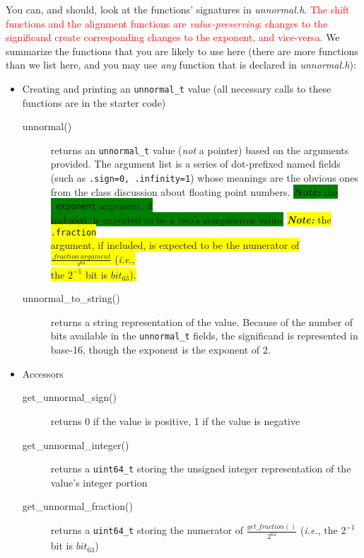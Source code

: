You can, and should, look at the functions' signatures in \textit{unnormal.h}.
\textcolor{red}{The shift functions and the alignment functions are \textit{value-preserving}: changes to the significand create corresponding changes to the exponent, and vice-versa.}
We summarize the functions that you are likely to use here (there are more functions than we list here, and you may use \textit{any} function that is declared in \textit{unnormal.h}):

\begin{itemize}
    \item Creating and printing an \lstinline{unnormal_t} value (all necessary calls to these functions are in the starter code)
    \begin{description}
        \item[unnormal()] returns an \lstinline{unnormal_t} value (\textit{not} a pointer) based on the arguments provided.
            The argument list is a series of dot-prefixed named fields (such as \lstinline{.sign=0, .infinity=1}) whose meanings are the obvious ones from the class discussion about floating point numbers.
            \colorbox{green}{\textit{\textbf{Note: }} the \lstinline{.exponent} argument, if} \\ \colorbox{green}{included, is expected to be a two's complement value.}
            \colorbox{yellow}{\textit{\textbf{Note: }} the \lstinline{.fraction}} \\ \colorbox{yellow}{argument, if included, is expected to be the numerator of $\frac{.fraction\ argument}{2^{64}}$ (\textit{i.e.},} \\ \colorbox{yellow}{the $2^{-1}$ bit is $bit_{63}$)\@.}
        \item[unnormal\_to\_string()] returns a string representation of the value.
            Because of the number of bits available in the \lstinline{unnormal_t} fields, the significand is represented in base-16, though the exponent is the exponent of 2.
    \end{description}
    \item Accessors
    \begin{description}
        \item[get\_unnormal\_sign()] returns 0 if the value is positive, 1 if the value is negative
        \item[get\_unnormal\_integer()] returns a \lstinline{uint64_t} storing the unsigned integer representation of the value's integer portion
        \item[get\_unnormal\_fraction()] returns a \lstinline{uint64_t} storing the numerator of $\frac{get\_fraction()}{2^{64}}$ (\textit{i.e.}, the $2^{-1}$ bit is $bit_{63}$)

\end{description}
\end{itemize}
